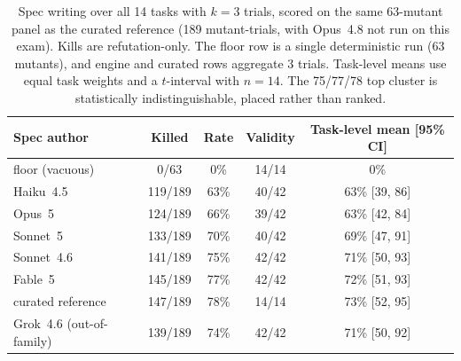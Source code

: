 \documentclass{article}
\newcommand{\ehaiku}{Haiku~4.5}
\newcommand{\esonnet}{Sonnet~4.6}
\newcommand{\eopus}{Opus~4.8}
\newcommand{\efable}{Fable~5}
\newcommand{\egrok}{Grok~4.6}
\begin{document}
\begin{table}[t]
\centering
\caption{Spec writing over all 14 tasks with $k{=}3$ trials, scored on the
same 63-mutant panel as the curated reference (189 mutant-trials, with
\eopus{} not run on this exam). Kills are refutation-only. The floor row
is a single deterministic run (63 mutants), and engine and curated rows
aggregate 3 trials. Task-level means use equal task weights and a
$t$-interval with $n{=}14$. The 75/77/78 top cluster is statistically
indistinguishable, placed rather than ranked.}
\label{tab:spec}
\small
\begin{tabular}{lcccc}
\toprule
Spec author & Killed & Rate & Validity & Task-level mean [95\% CI] \\
\midrule
floor (vacuous) & 0/63 & 0\% & 14/14 & 0\% \\
\ehaiku & 119/189 & 63\% & 40/42 & 63\% [39, 86] \\
Opus~5 & 124/189 & 66\% & 39/42 & 63\% [42, 84] \\
Sonnet~5 & 133/189 & 70\% & 40/42 & 69\% [47, 91] \\
\esonnet & 141/189 & 75\% & 42/42 & 71\% [50, 93] \\
\efable & 145/189 & 77\% & 42/42 & 72\% [51, 93] \\
curated reference & 147/189 & 78\% & 14/14 & 73\% [52, 95] \\
\midrule
\egrok{} (out-of-family) & 139/189 & 74\% & 42/42 & 71\% [50, 92] \\
\bottomrule
\end{tabular}
\end{table}
\end{document}
